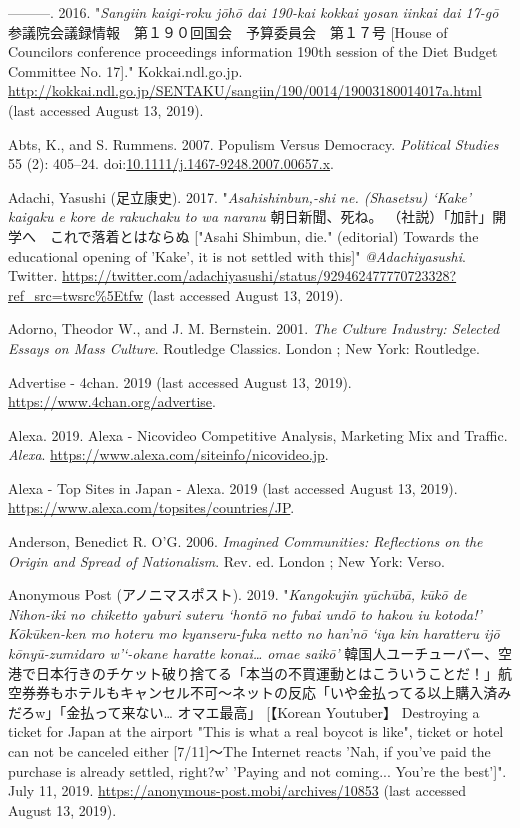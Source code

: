 \documentclass[10pt,british,A4paper,twoside]{memoir}
\begin{document}
\hypertarget{ref-abe_house_2016}{}
---------. 2016. "\emph{Sangiin kaigi-roku jōhō dai 190-kai kokkai yosan iinkai dai 17-gō} 参議院会議録情報　第１９０回国会　予算委員会　第１７号 [House of Councilors conference proceedings information 190th session of the Diet Budget Committee No. 17]." Kokkai.ndl.go.jp.
\url{http://kokkai.ndl.go.jp/SENTAKU/sangiin/190/0014/19003180014017a.html} (last accessed August 13, 2019).

\hypertarget{ref-abts_populism_2007}{}
Abts, K., and S. Rummens. 2007. Populism Versus Democracy.
\emph{Political Studies} 55 (2): 405--24.
doi:\href{https://doi.org/10.1111/j.1467-9248.2007.00657.x}{10.1111/j.1467-9248.2007.00657.x}.

\hypertarget{ref-adachi_eng._2017}{}
Adachi, Yasushi (足立康史). 2017. "\emph{Asahishinbun,-shi ne. (Shasetsu) `Kake' kaigaku e kore de rakuchaku to wa naranu} 朝日新聞、死ね。 （社説）「加計」開学へ　これで落着とはならぬ ["Asahi Shimbun, die." (editorial) Towards the educational opening of 'Kake', it is not settled with this]"
\emph{@Adachiyasushi}. Twitter.
\url{https://twitter.com/adachiyasushi/status/929462477770723328?ref_src=twsrc\%5Etfw} (last accessed August 13, 2019).

\hypertarget{ref-adorno_culture_2001}{}
Adorno, Theodor W., and J. M. Bernstein. 2001. \emph{The Culture
Industry: Selected Essays on Mass Culture}. Routledge Classics. London ;
New York: Routledge.

\hypertarget{ref-noauthor_advertise_nodate}{}
Advertise - 4chan. 2019 (last accessed August 13, 2019).
\url{https://www.4chan.org/advertise}.

\hypertarget{ref-alexa_alexa_2019}{}
Alexa. 2019. Alexa - Nicovideo Competitive Analysis, Marketing Mix and
Traffic. \emph{Alexa}.
\url{https://www.alexa.com/siteinfo/nicovideo.jp}.

\hypertarget{ref-noauthor_alexa_2019}{}
Alexa - Top Sites in Japan - Alexa. 2019 (last accessed August 13, 2019).
\url{https://www.alexa.com/topsites/countries/JP}.

\hypertarget{ref-anderson_imagined_2006}{}
Anderson, Benedict R. O'G. 2006. \emph{Imagined Communities: Reflections
on the Origin and Spread of Nationalism}. Rev. ed. London ; New York:
Verso.

\hypertarget{ref-anonymous_post_eng._2019}{}
Anonymous Post (アノニマスポスト). 2019. "\emph{Kangokujin yūchūbā, kūkō de Nihon-iki no chiketto yaburi suteru `hontō no fubai undō to hakou iu kotoda!' Kōkūken-ken mo hoteru mo kyanseru-fuka netto no han'nō `iya kin haratteru ijō kōnyū-zumidaro w'`-okane haratte konai… omae saikō'} 韓国人ユーチューバー、空港で日本行きのチケット破り捨てる「本当の不買運動とはこういうことだ！」航空券券もホテルもキャンセル不可～ネットの反応「いや金払ってる以上購入済みだろw」「金払って来ない… オマエ最高」 [【Korean Youtuber】 Destroying a ticket for Japan at the airport "This is what a real boycot is like", ticket or hotel can not be canceled either [7/11]～The Internet reacts 'Nah, if you've paid the purchase is already settled, right?w' 'Paying and not coming... You're the best']". July 11, 2019.
\url{https://anonymous-post.mobi/archives/10853} (last accessed August 13, 2019).
\end{document}
